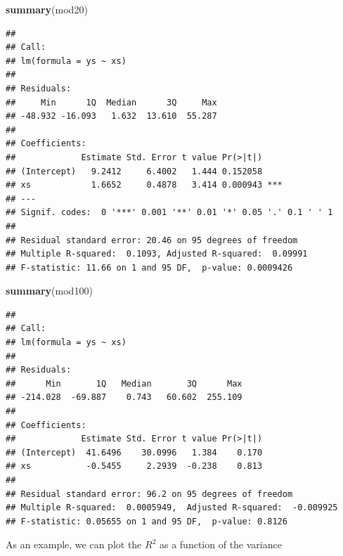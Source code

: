 \documentclass[
]{book}
\newenvironment{Shaded}{\begin{snugshade}}{\end{snugshade}}
\newcommand{\DecValTok}[1]{\textcolor[rgb]{0.00,0.00,0.81}{#1}}
\newcommand{\KeywordTok}[1]{\textcolor[rgb]{0.13,0.29,0.53}{\textbf{#1}}}
\newcommand{\NormalTok}[1]{#1}
\newcommand{\OperatorTok}[1]{\textcolor[rgb]{0.81,0.36,0.00}{\textbf{#1}}}
\begin{document}
\begin{Shaded}
\begin{Highlighting}[]
\KeywordTok{summary}\NormalTok{(mod20)}
\end{Highlighting}
\end{Shaded}

\begin{verbatim}
## 
## Call:
## lm(formula = ys ~ xs)
## 
## Residuals:
##     Min      1Q  Median      3Q     Max 
## -48.932 -16.093   1.632  13.610  55.287 
## 
## Coefficients:
##             Estimate Std. Error t value Pr(>|t|)    
## (Intercept)   9.2412     6.4002   1.444 0.152058    
## xs            1.6652     0.4878   3.414 0.000943 ***
## ---
## Signif. codes:  0 '***' 0.001 '**' 0.01 '*' 0.05 '.' 0.1 ' ' 1
## 
## Residual standard error: 20.46 on 95 degrees of freedom
## Multiple R-squared:  0.1093,	Adjusted R-squared:  0.09991 
## F-statistic: 11.66 on 1 and 95 DF,  p-value: 0.0009426
\end{verbatim}

\begin{Shaded}
\begin{Highlighting}[]
\KeywordTok{summary}\NormalTok{(mod100)}
\end{Highlighting}
\end{Shaded}

\begin{verbatim}
## 
## Call:
## lm(formula = ys ~ xs)
## 
## Residuals:
##      Min       1Q   Median       3Q      Max 
## -214.028  -69.887    0.743   60.602  255.109 
## 
## Coefficients:
##             Estimate Std. Error t value Pr(>|t|)
## (Intercept)  41.6496    30.0996   1.384    0.170
## xs           -0.5455     2.2939  -0.238    0.813
## 
## Residual standard error: 96.2 on 95 degrees of freedom
## Multiple R-squared:  0.0005949,	Adjusted R-squared:  -0.009925 
## F-statistic: 0.05655 on 1 and 95 DF,  p-value: 0.8126
\end{verbatim}

As an example, we can plot the \(R^2\) as a function of the variance

\begin{Shaded}
\end{Shaded}
\end{document}
